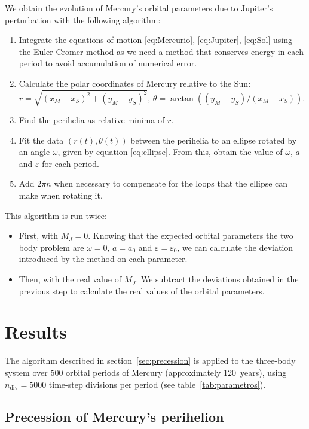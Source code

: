\documentclass[journal]{IEEEtran}
\begin{document}
We obtain the evolution of Mercury's orbital parameters due to Jupiter's perturbation with the following algorithm:
\begin{enumerate}
    \item Integrate the equations of motion \eqref{eq:Mercurio}, \eqref{eq:Jupiter}, \eqref{eq:Sol} using the Euler-Cromer method\cite{giordano} as we need a method that conserves energy in each period to avoid accumulation of numerical error.
    \item Calculate the polar coordinates of Mercury relative to the Sun: $r=\sqrt{(x_M-x_S)^2+(y_M-y_S)^2}$, $ \theta=\arctan((y_M-y_S)/(x_M-x_S)).$
    \item Find the perihelia as relative minima of $r$.
    \item Fit the data $(r(t),\theta(t))$ between the perihelia to an ellipse rotated by an angle $\omega$, given by equation \eqref{eq:ellipse}. From this, obtain the value of $\omega$, $a$ and $\varepsilon$ for each period.
    \item Add $2\pi n$ when necessary to compensate for the loops that the ellipse can make when rotating it.
\end{enumerate}
This algorithm is run twice:
\begin{itemize}
    \item First, with $M_J=0$. Knowing that the expected orbital parameters the two body problem are $\omega=0$, $a=a_0$ and $\varepsilon=\varepsilon_0$, we can calculate the deviation introduced by the method on each parameter.
    \item Then, with the real value of $M_J$. We subtract the deviations obtained in the previous step to calculate the real values of the orbital parameters.
\end{itemize}

\section{Results}

The algorithm described in section~\ref{sec:precession} is applied to the three-body system over 500 orbital periods of Mercury (approximately 120~years), using $n_{\text{div}}=5000$ time-step divisions per period (see table~\ref{tab:parametros}).

\subsection{Precession of Mercury's perihelion}
\end{document}
